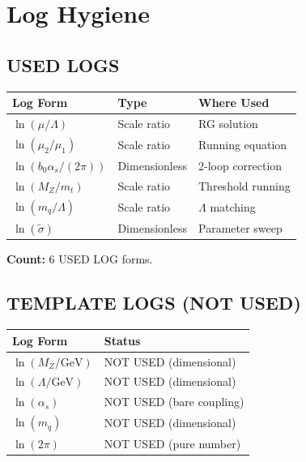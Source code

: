 \documentclass[11pt,a4paper]{article}
\theoremstyle{definition}
\begin{document}
\section{Log Hygiene}
\label{sec:logs}

\begin{loghygienebox}
\end{loghygienebox}

\subsection{USED LOGS}
\label{subsec:used-logs-canon}

\begin{center}
\begin{tabular}{lll}
\toprule
Log Form & Type & Where Used \\
\midrule
$\ln(\mu/\Lambda)$ & Scale ratio & RG solution \\
$\ln(\mu_2/\mu_1)$ & Scale ratio & Running equation \\
$\ln(b_0\alpha_s/(2\pi))$ & Dimensionless & 2-loop correction \\
$\ln(M_Z/m_t)$ & Scale ratio & Threshold running \\
$\ln(m_q/\Lambda)$ & Scale ratio & $\Lambda$ matching \\
$\ln(\tilde{\sigma})$ & Dimensionless & Parameter sweep \\
\bottomrule
\end{tabular}
\end{center}

\textbf{Count:} 6 USED LOG forms.

\subsection{TEMPLATE LOGS (NOT USED)}
\label{subsec:template-logs-canon}

\begin{center}
\begin{tabular}{ll}
\toprule
Log Form & Status \\
\midrule
$\ln(M_Z/\text{GeV})$ & NOT USED (dimensional) \\
$\ln(\Lambda/\text{GeV})$ & NOT USED (dimensional) \\
$\ln(\alpha_s)$ & NOT USED (bare coupling) \\
$\ln(m_q)$ & NOT USED (dimensional) \\
$\ln(2\pi)$ & NOT USED (pure number) \\
\bottomrule
\end{tabular}
\end{center}
\end{document}
